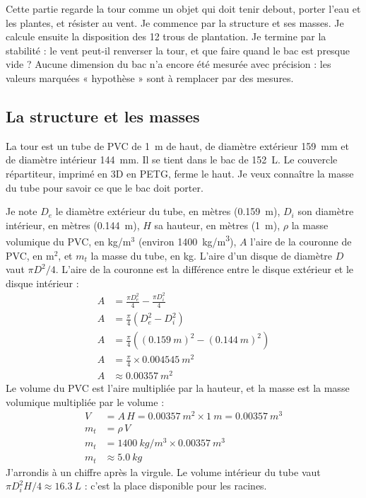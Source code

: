 \clearpage
{}

Cette partie regarde la tour comme un objet qui doit tenir debout, porter l'eau et les plantes, et résister au vent. Je commence par la structure et ses masses. Je calcule ensuite la disposition des 12 trous de plantation. Je termine par la stabilité : le vent peut-il renverser la tour, et que faire quand le bac est presque vide ? Aucune dimension du bac n'a encore été mesurée avec précision : les valeurs marquées « hypothèse » sont à remplacer par des mesures.

\subsection{La structure et les masses}

La tour est un tube de PVC de \qty{1}{m} de haut, de diamètre extérieur \qty{159}{mm} et de diamètre intérieur \qty{144}{mm}. Il se tient dans le bac de \qty{152}{L}. Le couvercle répartiteur, imprimé en 3D en PETG, ferme le haut. Je veux connaître la masse du tube pour savoir ce que le bac doit porter.

\begin{demonstration}
Je note $D_e$ le diamètre extérieur du tube, en mètres (\qty{0,159}{m}), $D_i$ son diamètre intérieur, en mètres (\qty{0,144}{m}), $H$ sa hauteur, en mètres (\qty{1}{m}), $\rho$ la masse volumique du PVC, en kg/m$^3$ (environ \qty{1400}{kg/m^3}), $A$ l'aire de la couronne de PVC, en m$^2$, et $m_t$ la masse du tube, en kg. L'aire d'un disque de diamètre $D$ vaut $\pi D^2/4$. L'aire de la couronne est la différence entre le disque extérieur et le disque intérieur :
\begin{align*}
A &= \frac{\pi D_e^2}{4} - \frac{\pi D_i^2}{4}\\
A &= \frac{\pi}{4}\left(D_e^2 - D_i^2\right)\\
A &= \frac{\pi}{4}\left((\qty{0,159}{m})^2 - (\qty{0,144}{m})^2\right)\\
A &= \frac{\pi}{4} \times \qty{0,004545}{m^2}\\
A &\approx \qty{0,00357}{m^2}
\end{align*}
Le volume du PVC est l'aire multipliée par la hauteur, et la masse est la masse volumique multipliée par le volume :
\begin{align*}
V &= A \, H = \qty{0,00357}{m^2} \times \qty{1}{m} = \qty{0,00357}{m^3}\\
m_t &= \rho \, V\\
m_t &= \qty{1400}{kg/m^3} \times \qty{0,00357}{m^3}\\
m_t &\approx \qty{5,0}{kg}
\end{align*}
J'arrondis à un chiffre après la virgule. Le volume intérieur du tube vaut $\pi D_i^2 H / 4 \approx \qty{16,3}{L}$ : c'est la place disponible pour les racines.
\end{demonstration}

